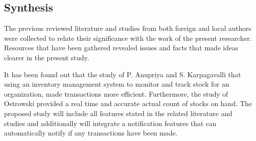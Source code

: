 
\subsection{Synthesis}
\vspace{-3ex}
The previous reviewed literature and studies from both foreign and local authors were collected to relate their significance with the work of the present researcher. Resources that have been gathered revealed issues and facts that made ideas clearer in the present study. 

It has been found out that the study of P. Anupriya and S. Karpagavalli that using an inventory management system to monitor and track stock for an organization, made transactions more efficient. Furthermore, the study of Ostrowski provided a real time and accurate actual count of stocks on hand. The proposed study will include all features stated in the related literature and studies and additionally will integrate a notification features that can automatically notify if any transactions have been made.



